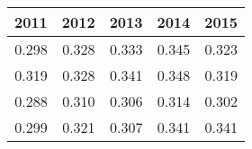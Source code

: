 \begin{tabular}{rrrrr}
\toprule
2011 & 2012 & 2013 & 2014 & 2015 \\
\midrule
0.298 & 0.328 & 0.333 & 0.345 & 0.323 \\
0.319 & 0.328 & 0.341 & 0.348 & 0.319 \\
0.288 & 0.310 & 0.306 & 0.314 & 0.302 \\
0.299 & 0.321 & 0.307 & 0.341 & 0.341 \\
\bottomrule
\end{tabular}
